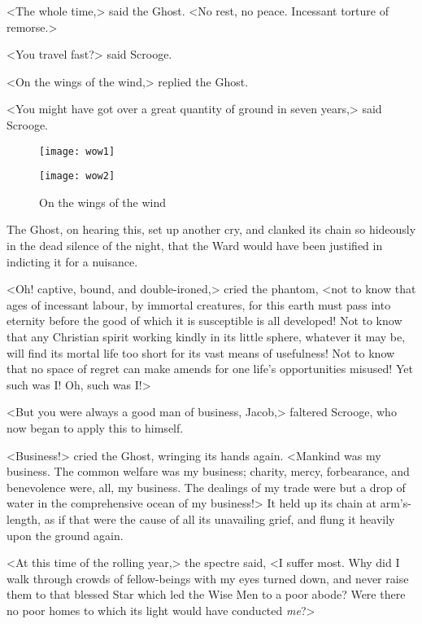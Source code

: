 <The whole time,> said the Ghost. <No rest, no peace. Incessant torture of remorse.>

<You travel fast?> said Scrooge.

<On the wings of the wind,> replied the Ghost. 

<You might have got over a great quantity of ground in seven years,> said Scrooge.
\begin{a4}
	\begin{figure}[t!]
	\centering
	\vfill
		\texttt{[image: wow1]}
		\vfill
	\end{figure}
\end{a4}

\begin{a4}
	\begin{figure}[b!]
		\centering
		\texttt{[image: wow2]}
		\caption{On the wings of the wind}
	\end{figure}
\end{a4}

The Ghost, on hearing this, set up another cry, and clanked its chain so hideously in the dead silence of the night, that the Ward would have been justified in indicting it for a nuisance.



<Oh! captive, bound, and double-ironed,> cried the phantom, <not to know that ages of incessant labour, by immortal creatures, for this earth must pass into eternity before the good of which it is susceptible is all developed! Not to know that any Christian spirit working kindly in its little sphere, whatever it may be, will find its mortal life too short for its vast means of usefulness! Not to know that no space of regret can make amends for one life's opportunities misused! Yet such was I\@! Oh, such was I\@!>



<But you were always a good man of business, Jacob,> faltered Scrooge, who now began to apply this to himself.

<Business!> cried the Ghost, wringing its hands again. <Mankind was my business. The common welfare was my business; charity, mercy, forbearance, and benevolence were, all, my business. The dealings of my trade were but a drop of water in the comprehensive ocean of my business!>
It held up its chain at arm's-length, as if that were the cause of all its unavailing grief, and flung it heavily upon the ground again.

<At this time of the rolling year,> the spectre said, <I suffer most. Why did I walk through crowds of fellow-beings with my eyes turned down, and never raise them to that blessed Star which led the Wise Men to a poor abode? Were there no poor homes to which its light would have conducted \textit{me}?>


